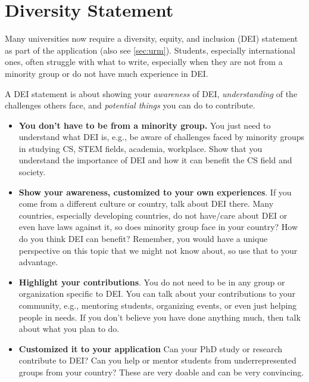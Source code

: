 \documentclass[oneside,11pt,dvipsnames]{book}
\begin{document}
\section{Diversity Statement}\label{sec:diversity-statement}


Many universities now require a diversity, equity, and inclusion (DEI) statement as part of the application (also see \autoref{sec:urm}). Students, especially international ones, often struggle with what to write, especially when they are not from a minority group or do not have much experience in DEI.

A DEI statement is about showing your \emph{awareness} of DEI, \emph{understanding} of the challenges others face, and \emph{potential things} you can do to contribute. 

\begin{itemize}
\item \textbf{You don't have to be from a minority group.} You just need to understand what DEI is, e.g., be aware of challenges faced by minority groups in studying CS, STEM fields, academia, workplace. Show that you understand the importance of DEI and how it can benefit the CS field and society. 

\item \textbf{Show your awareness, customized to your own experiences}. If you come from a different culture or country, talk about DEI there. Many countries, especially developing countries, do not have/care about DEI or even have laws against it, so does minority group face in your country?  How do you think DEI can benefit? Remember, you would have a unique perspective on this topic that we might not know about, so use that to your advantage.

\item \textbf{Highlight your contributions}.  You do not need to be in any group or organization specific to DEI.  You can talk about your contributions to your community, e.g., mentoring students, organizing events, or even just helping people in needs. If you don't believe you have done anything much, then talk about what you plan to do. 

\item \textbf{Customized it to your application} Can your PhD study or research contribute to DEI?  Can you help or mentor students from underrepresented groups from your country?  These are very doable and can be very convincing.  

\end{itemize}
\end{document}
